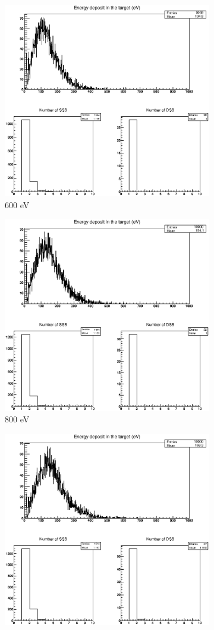 \begin{figure}
\begin{subfigure}{.5\textwidth}
  \includegraphics[width=.78\linewidth]{./Figures/proton600eV.eps}
  \caption{600 eV}
  \label{fig:sub3}
\end{subfigure}%
\begin{subfigure}{.5\textwidth}
  \centering
  \includegraphics[width=.78\linewidth]{./Figures/proton800eV.eps}
  \caption{800 eV}
  \label{fig:sub4}
\end{subfigure}
\begin{subfigure}{.5\textwidth}
  \centering
  \includegraphics[width=.78\linewidth]{./Figures/proton1kev.eps}

\end{subfigure}
\end{figure}
